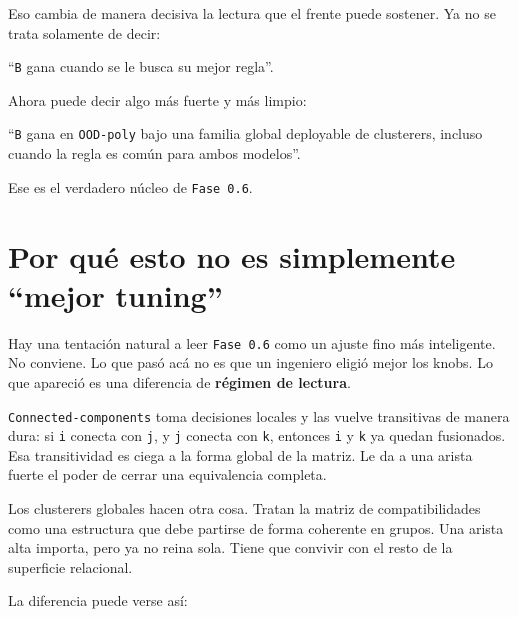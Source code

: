 \documentclass[11pt]{article}
\begin{document}
Eso cambia de manera decisiva la lectura que el frente puede sostener. Ya no se trata solamente de decir:

\begin{quietbox}
``\texttt{B} gana cuando se le busca su mejor regla''.
\end{quietbox}

Ahora puede decir algo más fuerte y más limpio:

\begin{goldbox}
``\texttt{B} gana en \texttt{OOD-poly} bajo una familia global deployable de clusterers, incluso cuando la regla es común para ambos modelos''.
\end{goldbox}

Ese es el verdadero núcleo de \texttt{Fase 0.6}.

\section{Por qué esto no es simplemente ``mejor tuning''}

Hay una tentación natural a leer \texttt{Fase 0.6} como un ajuste fino más inteligente. No conviene. Lo que pasó acá no es que un ingeniero eligió mejor los knobs. Lo que apareció es una diferencia de \textbf{régimen de lectura}.

\texttt{Connected-components} toma decisiones locales y las vuelve transitivas de manera dura: si \texttt{i} conecta con \texttt{j}, y \texttt{j} conecta con \texttt{k}, entonces \texttt{i} y \texttt{k} ya quedan fusionados. Esa transitividad es ciega a la forma global de la matriz. Le da a una arista fuerte el poder de cerrar una equivalencia completa.

Los clusterers globales hacen otra cosa. Tratan la matriz de compatibilidades como una estructura que debe partirse de forma coherente en grupos. Una arista alta importa, pero ya no reina sola. Tiene que convivir con el resto de la superficie relacional.

La diferencia puede verse así:
\end{document}
